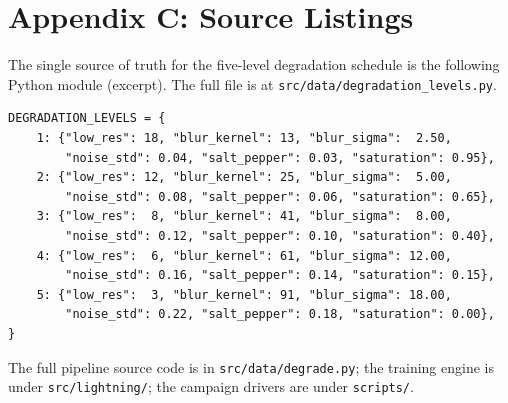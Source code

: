\section*{Appendix C: Source Listings}
\label{app:listings}

The single source of truth for the five-level degradation schedule is the
following Python module (excerpt). The full file is at
\texttt{src/data/degradation\_levels.py}.

\begin{small}\begin{verbatim}
DEGRADATION_LEVELS = {
    1: {"low_res": 18, "blur_kernel": 13, "blur_sigma":  2.50,
        "noise_std": 0.04, "salt_pepper": 0.03, "saturation": 0.95},
    2: {"low_res": 12, "blur_kernel": 25, "blur_sigma":  5.00,
        "noise_std": 0.08, "salt_pepper": 0.06, "saturation": 0.65},
    3: {"low_res":  8, "blur_kernel": 41, "blur_sigma":  8.00,
        "noise_std": 0.12, "salt_pepper": 0.10, "saturation": 0.40},
    4: {"low_res":  6, "blur_kernel": 61, "blur_sigma": 12.00,
        "noise_std": 0.16, "salt_pepper": 0.14, "saturation": 0.15},
    5: {"low_res":  3, "blur_kernel": 91, "blur_sigma": 18.00,
        "noise_std": 0.22, "salt_pepper": 0.18, "saturation": 0.00},
}
\end{verbatim}\end{small}

The full pipeline source code is in \texttt{src/data/degrade.py}; the
training engine is under \texttt{src/lightning/}; the campaign drivers are
under \texttt{scripts/}.
